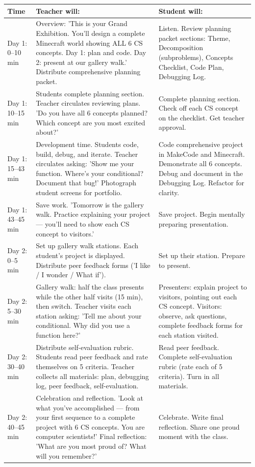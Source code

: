 \documentclass[11pt,letterpaper]{article}
\begin{document}
\begin{longtable}{|L{0.13\textwidth}|L{0.41\textwidth}|L{0.37\textwidth}|}
\hline
{}
\textbf{\color{white}\textbf{Time} } & \textbf{\color{white}\textbf{Teacher will:} } & \textbf{\color{white}\textbf{Student will:} } \\
\hline
Day 1: 0--10 min  & Overview: 'This is your Grand Exhibition. You'll design a complete Minecraft world showing ALL 6 CS concepts. Day 1: plan and code. Day 2: present at our gallery walk.' Distribute comprehensive planning packet.  & Listen. Review planning packet sections: Theme, Decomposition (subproblems), Concepts Checklist, Code Plan, Debugging Log.  \\
\hline
Day 1: 10--15 min  & Students complete planning section. Teacher circulates reviewing plans. 'Do you have all 6 concepts planned? Which concept are you most excited about?'  & Complete planning section. Check off each CS concept on the checklist. Get teacher approval.  \\
\hline
Day 1: 15--43 min  & Development time. Students code, build, debug, and iterate. Teacher circulates asking: 'Show me your function. Where's your conditional? Document that bug!' Photograph student screens for portfolio.  & Code comprehensive project in MakeCode and Minecraft. Demonstrate all 6 concepts. Debug and document in the Debugging Log. Refactor for clarity.  \\
\hline
Day 1: 43--45 min  & Save work. 'Tomorrow is the gallery walk. Practice explaining your project --- you'll need to show each CS concept to visitors.'  & Save project. Begin mentally preparing presentation.  \\
\hline
Day 2: 0--5 min  & Set up gallery walk stations. Each student's project is displayed. Distribute peer feedback forms ('I like / I wonder / What if').  & Set up their station. Prepare to present.  \\
\hline
Day 2: 5--30 min  & Gallery walk: half the class presents while the other half visits (15 min), then switch. Teacher visits each station asking: 'Tell me about your conditional. Why did you use a function here?'  & Presenters: explain project to visitors, pointing out each CS concept. Visitors: observe, ask questions, complete feedback forms for each station visited.  \\
\hline
Day 2: 30--40 min  & Distribute self-evaluation rubric. Students read peer feedback and rate themselves on 5 criteria. Teacher collects all materials: plan, debugging log, peer feedback, self-evaluation.  & Read peer feedback. Complete self-evaluation rubric (rate each of 5 criteria). Turn in all materials.  \\
\hline
Day 2: 40--45 min  & Celebration and reflection. 'Look at what you've accomplished --- from your first sequence to a complete project with 6 CS concepts. You are computer scientists!' Final reflection: 'What are you most proud of? What will you remember?'  & Celebrate. Write final reflection. Share one proud moment with the class.  \\
\hline
\end{longtable}
\end{document}
